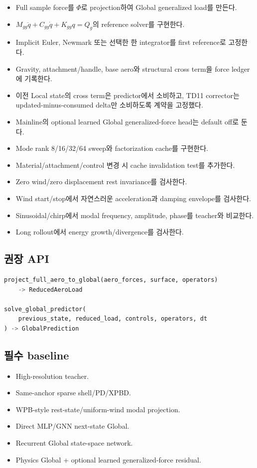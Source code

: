 \documentclass[10pt,a4paper]{article}
\newcommand{\todo}{\textcolor{TodoGray}{\(\square\)}}
\newcommand{\done}{\textcolor{DoneGreen}{\(\boxtimes\)}}
\begin{document}
\begin{itemize}
  \item[\todo] Full sample force를 \(\Phi\)로 projection하여 Global generalized load를 만든다.
  \item[\todo] \(M_{gg}\ddot q+C_{gg}\dot q+K_{gg}q=Q_g\)의 reference solver를 구현한다.
  \item[\todo] Implicit Euler, Newmark 또는 선택한 한 integrator를 first reference로 고정한다.
  \item[\todo] Gravity, attachment/handle, base aero와 structural cross term을 force ledger에 기록한다.
  \item[\done] 이전 Local state의 cross term은 predictor에서 소비하고, TD11 corrector는 updated-minus-consumed delta만 소비하도록 계약을 고정했다.
  \item[\todo] Mainline의 optional learned Global generalized-force head는 default off로 둔다.
  \item[\todo] Mode rank 8/16/32/64 sweep와 factorization cache를 구현한다.
  \item[\todo] Material/attachment/control 변경 시 cache invalidation test를 추가한다.
  \item[\todo] Zero wind/zero displacement rest invariance를 검사한다.
  \item[\todo] Wind start/stop에서 자연스러운 acceleration과 damping envelope를 검사한다.
  \item[\todo] Sinusoidal/chirp에서 modal frequency, amplitude, phase를 teacher와 비교한다.
  \item[\todo] Long rollout에서 energy growth/divergence를 검사한다.
\end{itemize}

\subsection*{권장 API}

\begin{lstlisting}[language=Python]
project_full_aero_to_global(aero_forces, surface, operators)
    -> ReducedAeroLoad

solve_global_predictor(
    previous_state, reduced_load, controls, operators, dt
) -> GlobalPrediction
\end{lstlisting}

\subsection*{필수 baseline}

\begin{itemize}
  \item High-resolution teacher.
  \item Same-anchor sparse shell/PD/XPBD.
  \item WPB-style rest-state/uniform-wind modal projection.
  \item Direct MLP/GNN next-state Global.
  \item Recurrent Global state-space network.
  \item Physics Global + optional learned generalized-force residual.
\end{itemize}
\end{document}
